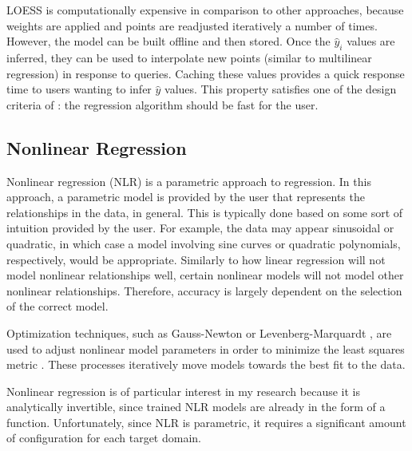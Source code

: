 LOESS is computationally expensive in comparison to other approaches,
because weights are applied and points are readjusted iteratively a number of times.
However, the model can be built offline and then stored.
Once the $\hat y_i$ values are inferred, they can be used to interpolate new points (similar to multilinear regression) in response to queries.
Caching these values provides a quick response time to users wanting to infer $\hat y$ values.
This property satisfies one of the design criteria of \fw: the regression algorithm should be fast for the user.


\subsection{Nonlinear Regression}

Nonlinear regression (NLR) is a parametric approach to regression.
In this approach, a parametric model is provided by the user that represents the relationships in the data, in general.
This is typically done based on some sort of intuition provided by the user.
For example, the data may appear sinusoidal or quadratic, in which case a model involving sine curves or quadratic polynomials, respectively, would be appropriate.
Similarly to how linear regression will not model nonlinear relationships well, certain nonlinear models will not model other nonlinear relationships.
Therefore, accuracy is largely dependent on the selection of the correct model.

Optimization techniques, such as Gauss-Newton or Levenberg-Marquardt \cite{mor1977levenberg}, are used to adjust nonlinear model parameters in order to minimize the least squares metric \cite{gallant1975nonlinear}.
These processes iteratively move models towards the best fit to the data.

Nonlinear regression is of particular interest in my research because it is analytically invertible, since trained NLR models are already in the form of a function.
Unfortunately, since NLR is parametric, it requires a significant amount of configuration for each target domain.

